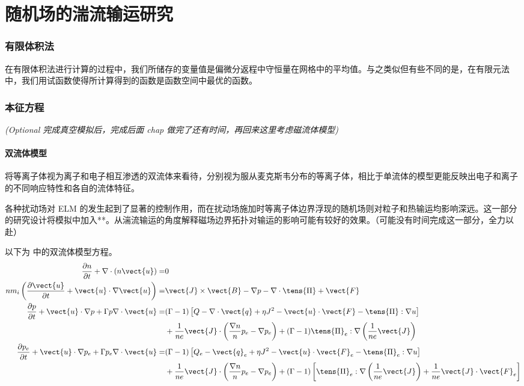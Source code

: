 \chapter{随机场的湍流输运研究}

\subsection{有限体积法}
在有限体积法进行计算的过程中，我们所储存的变量值是偏微分返程中守恒量在网格中的平均值。与之类似但有些不同的是，在有限元法中，我们用试函数使得所计算得到的函数是函数空间中最优的函数。

\subsection{本征方程}



\textit{(Optional 完成真空模拟后，完成后面 chap 做完了还有时间，再回来这里考虑磁流体模型)}


\subsubsection{双流体模型}
将等离子体视为离子和电子相互渗透的双流体来看待，分别视为服从麦克斯韦分布的等离子体，相比于单流体的模型更能反映出电子和离子的不同响应特性和各自的流体特征。

各种扰动场对 ELM 的发生起到了显著的控制作用，而在扰动场施加时等离子体边界浮现的随机场则对粒子和热输运均影响深远。这一部分的研究设计将模拟中加入**。从湍流输运的角度解释磁场边界拓扑对输运的影响可能有较好的效果。（可能没有时间完成这一部分，全力以赴）



以下为 \mdddc 中的双流体模型方程。
\begin{equation}\begin{aligned}
    \frac{\partial n}{\partial t}+\nabla \cdot(n \vect{u})=& 0 \\
    n m_{i}\left(\frac{\partial \vect{u}}{\partial t}+\vect{u} \cdot \nabla \vect{u}\right)=& \vect{J} \times \vect{B}-\nabla p-\nabla \cdot\tens{\Pi}+\vect{F} \\
    \frac{\partial p}{\partial t}+\vect{u} \cdot \nabla p+\Gamma p \nabla \cdot \vect{u}=&(\Gamma-1)\left[Q-\nabla \cdot \vect{q}+\eta J^{2}-\vect{u} \cdot \vect{F}-\tens{\Pi}: \nabla u\right] \\
    &+\frac{1}{n e} \vect{J} \cdot\left(\frac{\nabla n}{n} p_{e}-\nabla p_{e}\right)+(\Gamma-1) \tens{\Pi}_{e}: \nabla\left(\frac{1}{n e} \vect{J}\right) \\
    \frac{\partial p_{e}}{\partial t}+\vect{u} \cdot \nabla p_{e}+\Gamma p_{e} \nabla \cdot \vect{u}=&(\Gamma-1)\left[Q_{e}-\vect{q}_{e}+\eta J^{2}-\vect{u} \cdot \vect{F}_{e}-\tens{\Pi}_{e}: \nabla u\right] \\
    &+\frac{1}{n e} \vect{J} \cdot\left(\frac{\nabla n}{n} p_{e}-\nabla p_{e}\right)+(\Gamma-1)\left[\tens{\Pi}_{e}: \nabla\left(\frac{1}{n e} \vect{J}\right)+\frac{1}{n e} \vect{J} \cdot \vect{F}_{e}\right]
\end{aligned}\end{equation}


